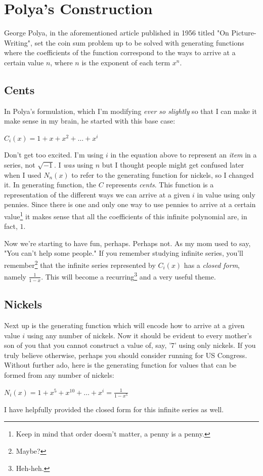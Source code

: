 \section{Polya's Construction}
George Polya, in the aforementioned article published in 1956 titled "On Picture-Writing", set the coin sum problem up to be solved with generating functions where the coefficients of the function correspond to the ways to arrive at a certain value $n$, where $n$ is the exponent of each term $x^n$.

\subsection{Cents}
In Polya's formulation, which I'm modifying \textit{ever so slightly} so that I can make it make sense in my brain, he started with this base case:
\begin{center}
$C_i(x) = 1 + x + x^2 + \ldots + x^i$
\end{center}
Don't get too excited.  I'm using $i$ in the equation above to represent an \textit{item} in a series, not $\sqrt{-1}$. I \textit{was} using $n$ but I thought people might get confused later when I used $N_n(x)$ to refer to the generating function for nickels, so I changed it. In  generating function, the $C$ represents \textit{cents}.  This function is a representation of the different ways we can arrive at a given $i$ in value using only pennies.  Since there is one and only one way to use pennies to arrive at a certain value\footnote{Keep in mind that order doesn't matter, a penny is a penny.} it makes sense that all the coefficients of this infinite polynomial are, in fact, $1$.  

Now we're starting to have fun, perhaps.  Perhaps not.  As my mom used to say, "You can't help some people."  If you remember studying infinite series, you'll remember\footnote{Maybe?} that the infinite series represented by $C_i(x)$ has a \textit{closed form}, namely $\frac{1}{1-x}$.  This will become a recurring\footnote{Heh-heh.} and a very useful theme.

\subsection{Nickels}
Next up is the generating function which will encode how to arrive at a given value $i$ using any number of nickels.  Now it should be evident to every mother's son of you that you cannot construct a value of, say, '$7$' using only nickels.  If you truly believe otherwise, perhaps you should consider running for US Congress.  Without further ado, here is the generating function for values that can be formed from any number of nickels:
\begin{center}
$N_i(x) = 1 + x^5 + x^{10} + \ldots + x^i = \displaystyle\frac{1}{1-x^5}$
\end{center}
I have helpfully provided the closed form for this infinite series as well.  

